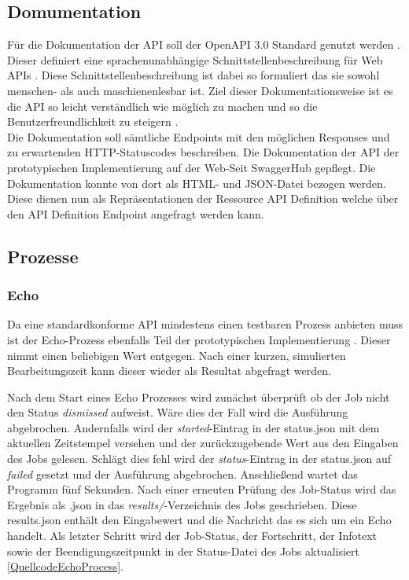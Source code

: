 \subsection{Domumentation}
Für die Dokumentation der API soll der OpenAPI 3.0 Standard genutzt werden \cite{ogc_api_processes_core}. 
Dieser definiert eine sprachenunabhängige Schnittstellenbeschreibung für Web APIs \cite{open_api}. 
Diese Schnittstellenbeschreibung ist dabei so formuliert das sie sowohl menschen- als auch maschienenlesbar ist. 
Ziel dieser Dokumentationsweise ist es die API so leicht verständlich wie möglich zu machen und so die Benutzerfreundlichkeit zu steigern \cite{open_api}. \\ 
Die Dokumentation soll sämtliche Endpoints mit den möglichen Responses und zu erwartenden HTTP-Statuscodes beschreiben. 
Die Dokumentation der API der prototypischen Implementierung auf der Web-Seit SwaggerHub gepflegt. Die Dokumentation konnte von dort als HTML- 
und JSON-Datei bezogen werden. Diese dienen nun als Repräsentationen der Ressource API Definition welche über den API Definition Endpoint angefragt werden kann. 

\subsection{Prozesse}
\subsubsection{Echo}
Da eine standardkonforme API mindestens einen testbaren Prozess anbieten muss ist der Echo-Prozess ebenfalls Teil der prototypischen Implementierung \cite{ogc_api_processes_core}. 
Dieser nimmt einen beliebigen Wert entgegen. Nach einer kurzen, simulierten Bearbeitungszeit kann dieser wieder als Resultat abgefragt werden. 

Nach dem Start eines Echo Prozesses wird zunächst überprüft ob der Job nicht den Status \textit{dismissed} aufweist. Wäre dies der Fall wird die Ausführung abgebrochen. 
Andernfalls wird der \textit{started}-Eintrag in der status.json mit dem aktuellen Zeitstempel versehen und der zurückzugebende Wert aus den Eingaben des Jobs gelesen.
Schlägt dies fehl wird der \textit{status}-Eintrag in der status.json auf \textit{failed} gesetzt und der Ausführung abgebrochen. 
Anschließend wartet das Programm fünf Sekunden. Nach einer erneuten Prüfung des Job-Status wird das Ergebnis als .json in das \textit{results/}-Verzeichnis des Jobs geschrieben.
Diese results.json enthält den Eingabewert und die Nachricht das es sich um ein Echo handelt. 
Als letzter Schritt wird der Job-Status, der Fortschritt, der Infotext sowie der Beendigungszeitpunkt in der Status-Datei des Jobs aktualisiert \ref{QuellcodeEchoProcess}. 
